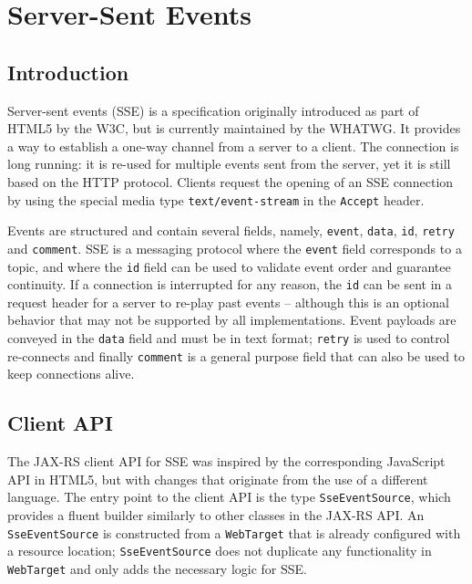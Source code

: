 \chapter{Server-Sent Events}
\label{sse}

\section{Introduction}
\label{sse_introduction}

Server-sent events (SSE) is a specification originally introduced as part of HTML5 by the W3C, but is currently
maintained by the WHATWG. It provides a way to establish a one-way channel from a server to a client. The connection is
long running: it is re-used for multiple events sent from the server, yet it is still based on the HTTP protocol.
Clients request the opening of an SSE connection by using the special media type \lstinline{text/event-stream} in the
\lstinline{Accept} header.

Events are structured and contain several fields, namely, \lstinline{event}, \lstinline{data}, \lstinline{id},
\lstinline{retry} and \lstinline{comment}. SSE is a messaging protocol where the \lstinline{event} field corresponds to
a topic, and where the \lstinline{id} field can be used to validate event order and guarantee continuity. If a
connection is interrupted for any reason, the \lstinline{id} can be sent in a request header for a server to re-play
past events -- although this is an optional behavior that may not be supported by all implementations. Event payloads are conveyed in the \lstinline{data} field and must be in text format; \lstinline{retry} is used to control re-connects and finally \lstinline{comment} is a general purpose field that can also be used to keep connections alive.

\section{Client API}
\label{sse_client_api}

The JAX-RS client API for SSE was inspired by the corresponding JavaScript API in HTML5, but with changes that originate
from the use of a different language. The entry point to the client API is the type \lstinline{SseEventSource}, which
provides a fluent builder similarly to other classes in the JAX-RS API. An \lstinline{SseEventSource} is constructed
from a \lstinline{WebTarget} that is already configured with a resource location; \lstinline{SseEventSource} does not
duplicate any functionality in \lstinline{WebTarget} and only adds the necessary logic for SSE.

